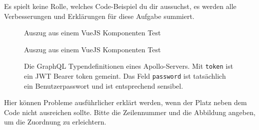 \documentclass[
addpoints,a4paper,ngerman,answers
]{exam}
\begin{document}
\begin{questions}
\begin{parts}
  Es spielt keine Rolle, welches Code-Beispiel du dir aussuchst, es werden alle
  Verbesserungen und Erklärungen für diese Aufgabe summiert.
\begin{figure}[h]
  
  \caption{Auszug aus einem VueJS Komponenten Test}
  \label{fig:apollo-server}
\end{figure}
\begin{figure}[h]
  
  \caption{Auszug aus einem VueJS Komponenten Test}
  \label{fig:apollo-server}
\end{figure}
\begin{figure}[h]
  
  \caption{Die GraphQL Typendefinitionen eines Apollo-Servers. Mit \texttt{token}
  ist ein JWT Bearer token gemeint. Das Feld \texttt{password} ist tatsächlich
  ein Benutzerpasswort und ist entsprechend sensibel.}
  \label{fig:apollo-server}
\end{figure}

\clearpage
  Hier können Probleme ausführlicher erklärt werden, wenn der Platz neben dem
  Code nicht ausreichen sollte. Bitte die Zeilennummer und die Abbildung
  angeben, um die Zuordnung zu erleichtern.

\end{parts}

\end{questions}
\end{document}
